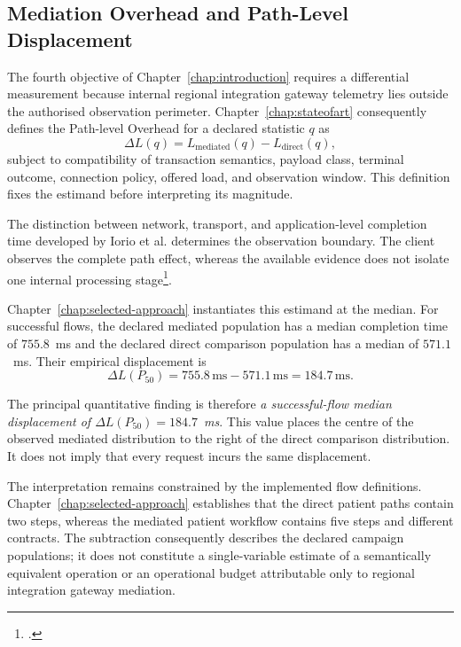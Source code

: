 \subsection{Mediation Overhead and Path-Level Displacement}
\label{subsec:conclusions-path-displacement}

\noindent The fourth objective of Chapter~\ref{chap:introduction} requires a
differential measurement because internal regional integration gateway telemetry lies outside the
authorised observation perimeter. Chapter~\ref{chap:stateofart} consequently
defines the Path-level Overhead for a declared statistic $q$ as
\begin{equation}
    \Delta L(q)
    = L_{\mathrm{mediated}}(q)-L_{\mathrm{direct}}(q),
\end{equation}
subject to compatibility of transaction semantics, payload class, terminal
outcome, connection policy, offered load, and observation window. This
definition fixes the estimand before interpreting its magnitude.

\noindent The distinction between network, transport, and application-level completion
time developed by Iorio et al. determines the observation boundary. The client
observes the complete path effect, whereas the available evidence does not
isolate one internal processing stage\footcite{iorio-when-latency-matters}.

\noindent Chapter~\ref{chap:selected-approach} instantiates this estimand at the median.
For successful flows, the declared mediated population has a median completion
time of $755.8$~ms and the declared direct comparison population has a median
of $571.1$~ms. Their empirical displacement is
\begin{equation}
    \Delta L(P_{50})=755.8\,\mathrm{ms}-571.1\,\mathrm{ms}
                   =184.7\,\mathrm{ms}.
\end{equation}

\noindent The principal quantitative finding is therefore
\emph{a successful-flow median displacement of
$\Delta L(P_{50})=184.7$~ms}. This value places the centre of the observed
mediated distribution to the right of the direct comparison distribution. It
does not imply that every request incurs the same displacement.

\noindent The interpretation remains constrained by the implemented flow definitions.
Chapter~\ref{chap:selected-approach} establishes that the direct patient paths
contain two steps, whereas the mediated patient workflow contains five steps
and different contracts. The subtraction consequently describes the declared
campaign populations; it does not constitute a single-variable estimate of a
semantically equivalent operation or an operational budget attributable only
to regional integration gateway mediation.

